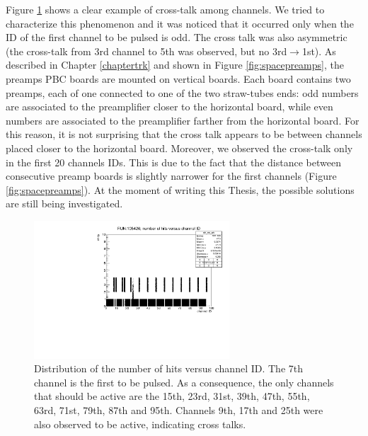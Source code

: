 Figure \ref{fig:cross} shows a clear example of 
cross-talk among channels. 
We tried to characterize this phenomenon and it was  
noticed that it occurred 
only when the ID of the first channel to be 
pulsed is odd.
The cross talk was also asymmetric 
(the cross-talk from 3rd channel to 5th was observed, 
but no 3rd$\rightarrow$1st).
As described in Chapter \ref{chaptertrk} 
and shown in Figure \ref{fig:spacepreamps}, 
the preamps PBC boards are mounted on vertical 
boards. Each board contains two preamps, each of one 
connected to one of the two straw-tubes ends: odd numbers 
are associated to the preamplifier closer to the horizontal 
board, while even numbers are associated to 
the preamplifier farther from the horizontal board. For this 
reason, it is not surprising that the cross talk 
appears to be between channels placed closer to 
the horizontal board. 
Moreover, we observed the cross-talk 
only in the first 20 channels IDs.
This is due to the fact that the 
distance between consecutive preamp 
boards is slightly narrower for the 
first channels (Figure \ref{fig:spacepreamps}).
At the moment of writing this Thesis, the 
possible solutions are still being investigated. 
\begin{figure}[!h]
  \centering
  \includegraphics[width=0.65\textwidth]{figures/pdf/run105420_nh_vs_ch.pdf}
  \caption[The occupancy plot and cross talks.]{Distribution of the number of hits versus channel ID. The 7th channel is the first to be pulsed. 
  As a consequence, the only channels that should be active are the 15th, 23rd, 31st, 39th, 47th, 55th, 63rd, 71st, 79th, 87th and 95th. 
  Channels 9th, 17th and 25th were also observed to be active, indicating cross talks.}
 \label{fig:cross}
\end{figure}

